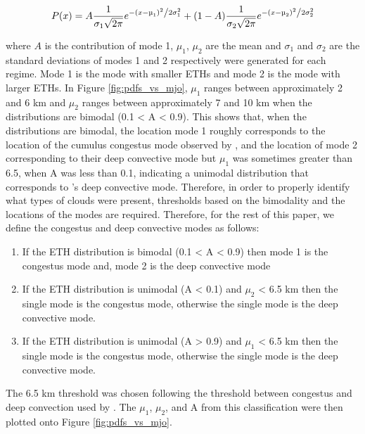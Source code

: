 \documentclass[journal abbreviation, manuscript]{copernicus}
\begin{document}
\begin{equation}
    P(x) = A\frac{1}{{\sigma_1 \sqrt {2\pi } }}e^{{{ - \left( {x - \mu_1 } \right)^2 } \mathord{\left/ {\vphantom {{ - \left( {x - \mu_1} \right)^2 } {2\sigma_1^2 }}} \right. \kern-\nulldelimiterspace} {2\sigma_1^2 }}} + (1-A)\frac{1}{{\sigma_2 \sqrt {2\pi } }}e^{{{ - \left( {x - \mu_2 } \right)^2 } \mathord{\left/ {\vphantom {{ - \left( {x - \mu_2} \right)^2 } {2\sigma_2^2 }}} \right. \kern-\nulldelimiterspace} {2\sigma_2^2 }}}
\end{equation}

where $A$ is the contribution of mode 1, $\mu_1$, $\mu_2$ are the mean and $\sigma_1$ and $\sigma_2$ are the standard deviations of modes 1 and 2 respectively were generated for each regime. Mode 1 is the mode with smaller ETHs and mode 2 is the mode with larger ETHs. In Figure \ref{fig:pdfs_vs_mjo}, $\mu_1$ ranges between approximately 2 and 6 km and $\mu_2$ ranges between approximately 7 and 10 km when the distributions are bimodal (0.1 < A < 0.9). This shows that, when the distributions are bimodal, the location mode 1 roughly corresponds to the location of the cumulus congestus mode observed by \cite{Johnsonetal1999, Kumaretal2013b}, and the location of mode 2 corresponding to their deep convective mode but $\mu_1$ was sometimes greater than 6.5, when A was less than 0.1, indicating a unimodal distribution that corresponds to \cite{Kumaretal2013b}'s deep convective mode. Therefore, in order to properly identify what types of clouds were present, thresholds based on the bimodality and the locations of the modes are required. Therefore, for the rest of this paper, we define the congestus and deep convective modes as follows:
\begin{enumerate}
\item If the ETH distribution is bimodal (0.1 < A < 0.9) then mode 1 is the congestus mode and, mode 2 is the deep convective mode
\item If the ETH distribution is unimodal (A < 0.1) and $\mu_2$ < 6.5 km then the single mode is the congestus mode, otherwise the single mode is the deep convective mode. 
\item If the ETH distribution is unimodal (A > 0.9) and $\mu_1$ < 6.5 km then the single mode is the congestus mode, otherwise the single mode is the deep convective mode. 
\end{enumerate}
The 6.5 km threshold was chosen following the threshold between congestus and deep convection used by \cite{Kumaretal2013b}. The $\mu_1$, $\mu_2$, and A from this classification were then plotted onto Figure \ref{fig:pdfs_vs_mjo}. 
  
\end{document}
